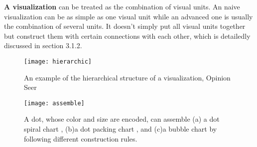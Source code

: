 \textbf{A visualization} can be treated as the combination of visual units. An naive visualization can be as simple as one visual unit while an advanced one is usually the combination of several units. It doesn't simply put all visual units together but construct them with certain connections with each other, which is detailedly discussed in section 3.1.2.

\begin{figure}
 \centering %
 \texttt{[image: hierarchic]}
 \caption{An example of the hierarchical structure of a visualization, Opinion Seer\cite{wu_opinionseer:_2010}}
 \label{fig:hierarchic}
\end{figure}

\begin{figure}
\begin{minipage}{\columnwidth}
 \centering %
 \texttt{[image: assemble]}
\caption[assemble]
{ A dot, whose color and size are encoded, can assemble 
(a) a dot spiral chart
\protect\footnotemark{}
    , (b)a dot packing chart
  \footnotemark{}
  , and (c)a bubble chart
  \footnotemark{}
   by following different construction rules.
}
\end{minipage}
\label{fig:hierarchic}
\end{figure}

